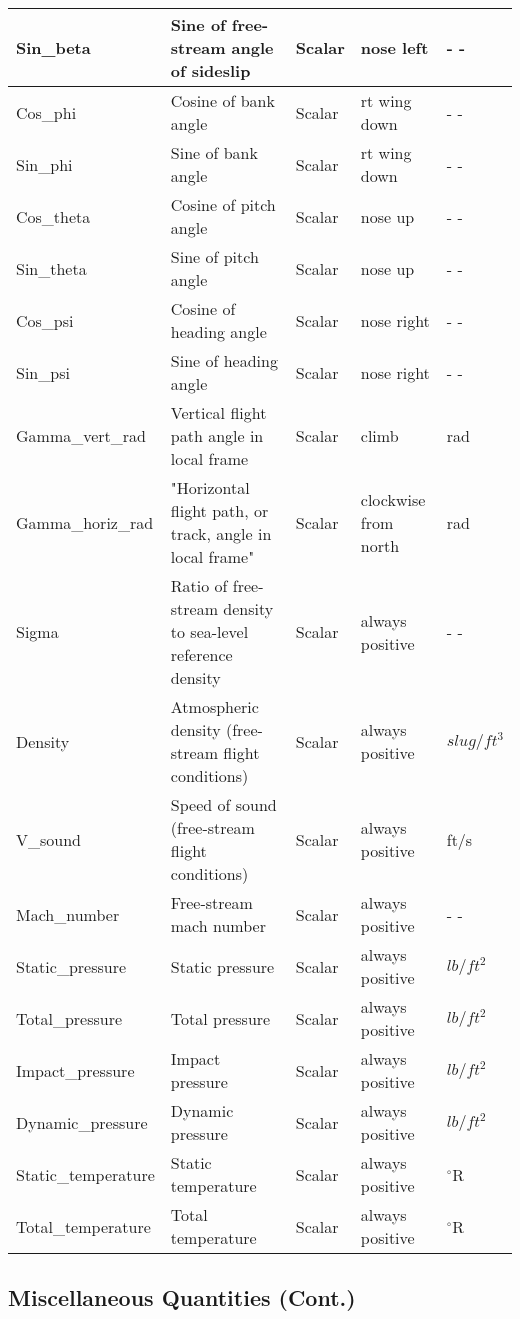 \documentclass[10pt]{article}
\begin{document}
\begin{tabular}{|l|p{2.0in}|p{1.0in}|p{1.0in}|l|}
Sin\_beta & Sine of free-stream angle of sideslip & Scalar & nose left & - - \\
\hline
Cos\_phi & Cosine of bank angle & Scalar & rt wing down & - - \\
Sin\_phi & Sine of bank angle & Scalar & rt wing down & - - \\
Cos\_theta & Cosine of pitch angle & Scalar & nose up & - - \\
Sin\_theta & Sine of pitch angle & Scalar & nose up & - - \\
Cos\_psi & Cosine of heading angle & Scalar & nose right & - - \\
Sin\_psi & Sine of heading angle & Scalar & nose right & - - \\
\hline
Gamma\_vert\_rad & Vertical flight path angle in local frame & Scalar & climb & rad \\
Gamma\_horiz\_rad & "Horizontal flight path, or track, angle in local frame" & Scalar & clockwise from north & rad \\
\hline
Sigma & Ratio of free-stream density to sea-level reference density & Scalar & always positive & - - \\
Density & Atmospheric density (free-stream flight conditions) & Scalar & always positive & $slug/ft^3$ \\
V\_sound & Speed of sound (free-stream flight conditions) & Scalar & always positive & ft/s \\
Mach\_number & Free-stream mach number & Scalar & always positive & - - \\
\hline
Static\_pressure & Static pressure & Scalar & always positive & $lb/ft^2$ \\
Total\_pressure & Total pressure & Scalar & always positive & $lb/ft^2$ \\
Impact\_pressure & Impact pressure & Scalar & always positive & $lb/ft^2$ \\
Dynamic\_pressure & Dynamic pressure & Scalar & always positive & $lb/ft^2$ \\
\hline
Static\_temperature & Static temperature & Scalar & always positive &
$^{\circ}$R \\
Total\_temperature & Total temperature & Scalar & always positive &
$^{\circ}$R \\
\hline
\end{tabular}

\subsection{Miscellaneous Quantities (Cont.)}
\end{document}
